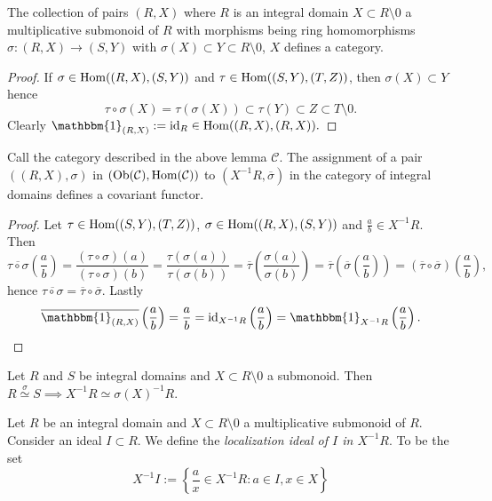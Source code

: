 \begin{lemma}
    The collection of pairs $(R,X)$ where $R$ is an integral domain $X\subset R\setminus 0$ a multiplicative submonoid of $R$ with morphisms being ring homomorphisms $\sigma:(R,X)\rightarrow (S,Y)$ with $\sigma(X)\subset Y\subset R\setminus 0$, $X$ defines a category. 
\end{lemma}
\begin{proof}
    If $\sigma \in \mathrm{Hom}((R,X),(S,Y))$ and $\tau \in \mathrm{Hom}((S,Y),(T,Z))$, then $\sigma(X)\subset Y$ hence $$\tau\circ \sigma(X)=\tau(\sigma(X))\subset \tau(Y)\subset Z\subset T\setminus 0.$$
    Clearly $\mathbbm{1}_{(R,X)}:= \mathrm{id}_R \in \Hom((R,X),(R,X)).$
\end{proof}
\begin{proposition}
    Call the category described in the above lemma $\mathcal{C}$. The assignment of a pair $((R,X),\sigma)$ in $(\text{Ob}(\mathcal{C}),\mathrm{Hom}(\mathcal{C}))$ to $(X^{-1}R,\overline{\sigma})$ in the category of integral domains defines a covariant functor. 
\end{proposition}
\begin{proof}
    Let $\tau\in \mathrm{Hom}((S,Y),(T,Z))$, $\sigma\in \mathrm{Hom}((R,X),(S,Y))$ and $\frac{a}{b}\in X^{-1}R$. Then
    $$\overline{\tau\circ\sigma}\left(\frac{a}{b}\right)=\frac{(\tau\circ\sigma)(a)}{(\tau\circ\sigma)(b)}=\frac{\tau(\sigma(a))}{\tau(\sigma(b))} = \overline{\tau}\left(\frac{\sigma(a)}{\sigma(b)}\right)=\overline{\tau}\left(\overline{\sigma}\left(\frac{a}{b}\right)\right)=(\overline{\tau}\circ\overline{\sigma})\left(\frac{a}{b}\right),$$
    hence $\overline{\tau\circ\sigma} = \overline{\tau}\circ\overline{\sigma}.$ Lastly 
    $$\overline{\mathbbm{1}_{(R,X)}}\left(\frac{a}{b}\right)=\frac{a}{b}=\mathrm{id}_{X^{-1}R}\left(\frac{a}{b}\right)=\mathbbm{1}_{X^{-1}R}\left(\frac{a}{b}\right).$$
\end{proof}
\begin{corollary}\label{LocalizationFunctorGivesIso}
    Let $R$ and $S$ be integral domains and $X\subset R\setminus 0$ a submonoid. Then $R\overset{\sigma}{\simeq} S \implies X^{-1}R\simeq \sigma(X)^{-1}R$.
\end{corollary}
\begin{definition}
    Let $R$ be an integral domain and $X\subset R\setminus 0$ a multiplicative submonoid of $R$. Consider an ideal $I\subset R$. We define the \textit{localization ideal of $I$ in $X^{-1}R$}. To be the set 
    $$X^{-1}I:=\left\{\frac{a}{x}\in X^{-1}R: a\in I, x\in X\right\}$$
\end{definition}
